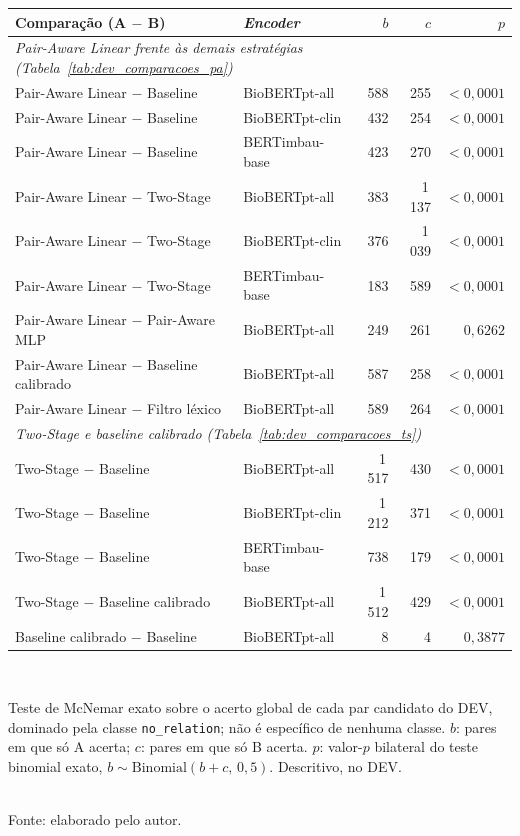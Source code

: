 \begin{quadro}[htbp]
  \centering
  \caption{Teste de McNemar das comparações pareadas entre estratégias, no DEV.}
  \label{quad:mcnemar}
  \small
  \begin{tabular}{llrrr}
  \toprule
  Comparação (A $-$ B) & \emph{Encoder} & $b$ & $c$ & $p$ \\
  \midrule
  \multicolumn{5}{l}{\textit{Pair-Aware Linear frente às demais estratégias (Tabela~\ref{tab:dev_comparacoes_pa})}} \\
  Pair-Aware Linear $-$ Baseline & BioBERTpt-all & 588 & 255 & $<0{,}0001$ \\
  Pair-Aware Linear $-$ Baseline & BioBERTpt-clin & 432 & 254 & $<0{,}0001$ \\
  Pair-Aware Linear $-$ Baseline & BERTimbau-base & 423 & 270 & $<0{,}0001$ \\
  Pair-Aware Linear $-$ Two-Stage & BioBERTpt-all & 383 & 1\,137 & $<0{,}0001$ \\
  Pair-Aware Linear $-$ Two-Stage & BioBERTpt-clin & 376 & 1\,039 & $<0{,}0001$ \\
  Pair-Aware Linear $-$ Two-Stage & BERTimbau-base & 183 & 589 & $<0{,}0001$ \\
  Pair-Aware Linear $-$ Pair-Aware MLP & BioBERTpt-all & 249 & 261 & $0{,}6262$ \\
  Pair-Aware Linear $-$ Baseline calibrado & BioBERTpt-all & 587 & 258 & $<0{,}0001$ \\
  Pair-Aware Linear $-$ Filtro léxico & BioBERTpt-all & 589 & 264 & $<0{,}0001$ \\
  \midrule
  \multicolumn{5}{l}{\textit{Two-Stage e baseline calibrado (Tabela~\ref{tab:dev_comparacoes_ts})}} \\
  Two-Stage $-$ Baseline & BioBERTpt-all & 1\,517 & 430 & $<0{,}0001$ \\
  Two-Stage $-$ Baseline & BioBERTpt-clin & 1\,212 & 371 & $<0{,}0001$ \\
  Two-Stage $-$ Baseline & BERTimbau-base & 738 & 179 & $<0{,}0001$ \\
  Two-Stage $-$ Baseline calibrado & BioBERTpt-all & 1\,512 & 429 & $<0{,}0001$ \\
  Baseline calibrado $-$ Baseline & BioBERTpt-all & 8 & 4 & $0{,}3877$ \\
  \bottomrule
  \end{tabular}\\[2pt]
  \parbox{\textwidth}{\footnotesize Teste de McNemar exato sobre o acerto global de cada par candidato do DEV, dominado pela classe \texttt{no\_relation}; não é específico de nenhuma classe. $b$: pares em que só A acerta; $c$: pares em que só B acerta. $p$: valor-$p$ bilateral do teste binomial exato, $b \sim \mathrm{Binomial}(b+c,\,0{,}5)$. Descritivo, no DEV.}\\[4pt]
  {\footnotesize Fonte: elaborado pelo autor.}
\end{quadro}
